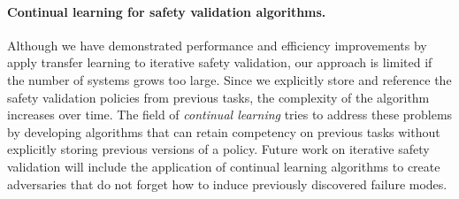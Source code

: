 \paragraph{Continual learning for safety validation algorithms.} Although we have demonstrated performance and efficiency improvements by apply transfer learning to iterative safety validation, our approach is limited if the number of systems grows too large. Since we explicitly store and reference the safety validation policies from previous tasks, the complexity of the algorithm increases over time. The field of \emph{continual learning} tries to address these problems by developing algorithms that can retain competency on previous tasks without explicitly storing previous versions of a policy. Future work on iterative safety validation will include the application of continual learning algorithms to create adversaries that do not forget how to induce previously discovered failure modes. 